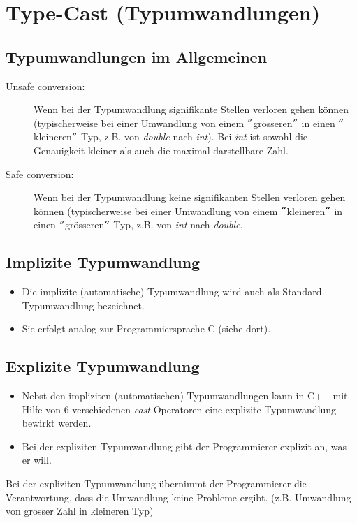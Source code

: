 \section{Type-Cast (Typumwandlungen)}

\subsection{Typumwandlungen im Allgemeinen}
\begin{description}
	\item [Unsafe conversion:] Wenn bei der Typumwandlung signifikante Stellen verloren gehen können (typischerweise bei einer Umwandlung von einem $"$grösseren$"$ in einen $"$kleineren$"$ Typ, z.B. von \emph{double} nach \emph{int}). Bei \emph{int} ist sowohl die Genauigkeit kleiner als auch die maximal darstellbare Zahl.
	\item [Safe conversion:] Wenn bei der Typumwandlung keine signifikanten Stellen verloren gehen können (typischerweise bei einer Umwandlung von einem $"$kleineren$"$ in einen $"$grösseren$"$ Typ, z.B. von \emph{int} nach \emph{double}.
\end{description}

\subsection{Implizite Typumwandlung}
\begin{itemize}
	\item Die implizite (automatische) Typumwandlung wird auch als Standard-Typumwandlung bezeichnet.
	\item Sie erfolgt analog zur Programmiersprache C (siehe dort).
\end{itemize}

\subsection{Explizite Typumwandlung}
\begin{itemize}
	\item Nebst den impliziten (automatischen) Typumwandlungen kann in C++ mit Hilfe von 6 verschiedenen \emph{cast}-Operatoren eine explizite Typumwandlung bewirkt werden.
	\item Bei der expliziten Typumwandlung gibt der Programmierer explizit an, was er will.
\end{itemize}
\begin{achtung}
	Bei der expliziten Typumwandlung übernimmt der Programmierer die Verantwortung, dass die Umwandlung keine Probleme ergibt. (z.B. Umwandlung von grosser Zahl in kleineren Typ)
\end{achtung}

